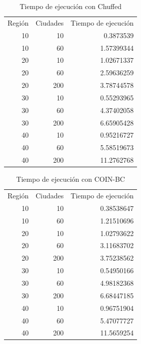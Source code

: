 \documentclass{article}
\begin{document}
\begin{table}[h]
    \centering
    \caption{Tiempo de ejecución con Chuffed}
      \begin{tabular}{rrr}
      \multicolumn{1}{l}{Región} & \multicolumn{1}{l}{Ciudades} & \multicolumn{1}{l}{Tiempo de ejecución} \\
      10    & 10    & 0.3873539 \\
      10    & 60    & 1.57399344 \\
      20    & 10    & 1.02671337 \\
      20    & 60    & 2.59636259 \\
      20    & 200   & 3.78744578 \\
      30    & 10    & 0.55293965 \\
      30    & 60    & 4.37402058 \\
      30    & 200   & 6.65905428 \\
      40    & 10    & 0.95216727 \\
      40    & 60    & 5.58519673 \\
      40    & 200   & 11.2762768 \\
      \end{tabular}%
    \label{tab:addlabel}%
\end{table}%

\begin{table}[h]
    \centering
    \caption{Tiempo de ejecución con COIN-BC}
      \begin{tabular}{rrr}
      \multicolumn{1}{l}{Región} & \multicolumn{1}{l}{Ciudades} & \multicolumn{1}{l}{Tiempo de ejecución} \\
      10    & 10    & 0.38538647 \\
      10    & 60    & 1.21510696 \\
      20    & 10    & 1.02793622 \\
      20    & 60    & 3.11683702 \\
      20    & 200   & 3.75238562 \\
      30    & 10    & 0.54950166 \\
      30    & 60    & 4.98182368 \\
      30    & 200   & 6.68447185 \\
      40    & 10    & 0.96751904 \\
      40    & 60    & 5.47077727 \\
      40    & 200   & 11.5659254 \\
      \end{tabular}%
    \label{tab:addlabel}%
\end{table}%
\end{document}
